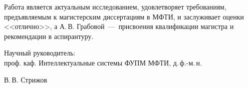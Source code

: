 \documentclass[12pt]{article}
\begin{document}
Работа является актуальным исследованием, удовлетворяет требованиям, предъявляемым к магистерским диссертациям в МФТИ, и заслуживает оценки <<отлично>>, а А.\,В. Грабовой~---~присвоения квалификации магистра и рекомендации в аспирантуру.


\vspace{3cm}
\begin{flushleft}
Научный руководитель:\\
проф. каф. Интеллектуальные системы ФУПМ МФТИ, д.\,ф.-м.\,н.\\
\end{flushleft}
\begin{flushright}
В.\,В. Стрижов
\end{flushright}
\end{document}
